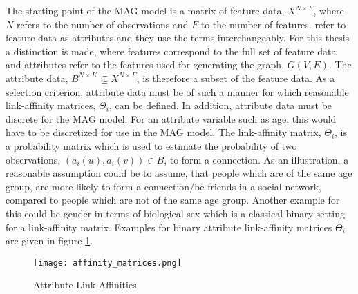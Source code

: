 	\noindent The starting point of the MAG model is a matrix of feature data, 
	$X^{N \times F}$, where $N$ refers to the number of observations 
	and $F$ to the number of features. \cite{kim2012multiplicative} refer to 
	feature data as attributes and they use the terms interchangeably. For this 
	thesis a distinction is made, where features correspond to the full set of 
	feature data and attributes refer to the features used for generating the 
	graph, $G(V,E)$. The attribute data, $B^{N \times K} \subseteq X^{N \times F}$, 
	is therefore a subset of the feature data. As a selection criterion,
	attribute data must be of such a manner for which reasonable link-affinity
	matrices, $\Theta_{i}$, can be defined. In addition, attribute data must be
	discrete for the MAG model. For an attribute variable such as age, this
	would have to be discretized for use in the MAG model. The link-affinity
	matrix, $\Theta_{i}$, is a probability matrix which is used to estimate the
	probability of two observations, $(a_{i}(u),a_{i}(v))\in B$, to form a 
	connection. As an illustration, a reasonable assumption could be to assume, 
	that people which are of the same age group, are more likely to form a 
	connection/be friends in a social network, compared to people which are not 
	of the same age group. Another example for this could be gender in terms of 
	biological sex which is a classical binary setting for a link-affinity matrix. 
	Examples for binary attribute link-affinity matrices $\Theta_i$ are given in 
	figure \ref{fig:link-affinity}.

	\begin{figure}[h]
		\centering
		\texttt{[image: affinity\_matrices.png]}
		\caption{Attribute Link-Affinities}
		\cite[p. 118]{kim2012multiplicative}
		\label{fig:link-affinity}
	\end{figure}


